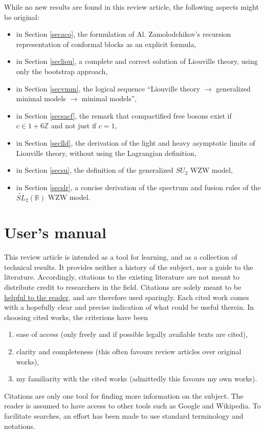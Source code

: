 \documentclass[12pt,a4paper,notitlepage]{report}
\numberwithin{equation}{section}
\theoremstyle{break}
\begin{document}
While no new results are found in this review article, the following aspects might be original:
\begin{itemize}
\item in Section \ref{secaco}, the formulation of Al. Zamolodchikov's recursion representation of conformal blocks as an explicit formula,
\item in Section \ref{secliou}, a complete and correct solution of Liouville theory, using only the bootstrap approach, 
\item in Section \ref{secvmm}, the logical sequence ``Liouville theory $\rightarrow$ generalized minimal models $\rightarrow$ minimal models'',
\item in Section \ref{secsacf}, the remark that compactified free bosons exist if $c\in 1+6{\mathbb{Z}}$ and not just if $c=1$,
\item in Section \ref{seclld}, the derivation of the light and heavy asymptotic limits of Liouville theory, without using the Lagrangian definition,
\item in Section \ref{secsu}, the definition of the generalized $SU_2$ WZW model,
\item in Section \ref{secslr}, a concise derivation of the spectrum and fusion rules of the $\widetilde{SL}_2(\mathbb{R})$ WZW model.
\end{itemize}


\section{User's manual}

This review article is intended as a tool for learning, and as a collection of technical results.
It provides neither a history of the subject, nor a guide to the literature.
Accordingly, citations to the existing literature are not meant to distribute credit to researchers in the field.
Citations are solely meant to be 
\href{http://researchpracticesandtools.blogspot.fr/2013/08/write-for-humans-not-for-robots.html}
{helpful to the reader}, and are therefore used sparingly.
Each cited work comes with a hopefully clear and precise indication of what could be useful therein.
In choosing cited works, the criterions have been
\begin{enumerate}
\item ease of access (only freely and if possible legally available texts are cited), 
\item clarity and completeness (this often favours review articles over original works),
\item my familiarity with the cited works (admittedly this favours my own works). 
\end{enumerate}
Citations are only one tool for finding more information on the subject. 
The reader is assumed to have access to other tools such as Google and Wikipedia. 
To facilitate searches, an effort has been made to use standard terminology and notations. 
\end{document}
